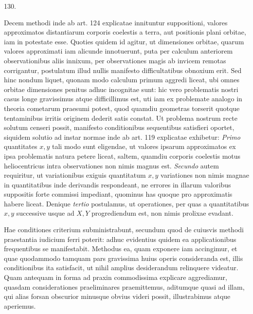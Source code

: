 \par{}\medskip
\begin{center}\hypertarget{native-177-article130}{}130.\end{center}
Decem methodi inde ab art. 124 explicatae innituntur suppositioni, valores
approximatos distantiarum corporis coelestis a terra, aut positionis plani
orbitae, iam in potestate esse. Quoties quidem id agitur, ut dimensiones
orbitae, quarum valores approximati iam alicunde innotuerunt, puta per calculum
anteriorem observationibus aliis innixum, per observationes magis ab invicem
remotas corrigantur, postulatum illud nullis manifesto difficultatibus obnoxium
erit. Sed hinc nondum liquet, quonam modo calculum primum aggredi liceat,
ubi omnes orbitae dimensiones penitus adhuc incognitae sunt: hic vero
problematis nostri casus longe gravissimus atque difficillimus est, uti iam
ex problemate analogo in theoria cometarum praesumi potest, quod quamdiu
geometras torserit quotque tentaminibus irritis originem dederit satis constat.
Ut problema nostrum recte solutum censeri possit, manifesto conditionibus
sequentibus satisfieri oportet, siquidem solutio ad instar normae inde ab
art. 119 explicatae exhibetur: \emph{Primo} quantitates $x,y$ tali modo sunt
eligendae, ut valores ipsarum approximatos ex ipsa problematis natura petere
liceat, saltem, quamdiu corporis coelestis motus heliocentricus intra
observationes non nimis magnus est. \emph{Secundo} autem requiritur, ut variationibus
exiguis quantitatum $x,y$ variationes non nimis magnae in quantitatibus inde
derivandis respondeant, ne errores in illarum valoribus suppositis forte
commissi impediant, quominus has quoque pro approximatis habere liceat.
Denique \emph{tertio} postulamus, ut operationes, per quas a quantitatibus $x,y$
successive usque ad $X,Y$ progrediendum est, non nimis prolixae evadant.

Hae conditiones criterium subministrabunt, secundum quod de cuiusvis
methodi praestantia iudicium ferri poterit: adhuc evidentius quidem ea
applicationibus frequentibus se manifestabit. Methodus ea, quam exponere iam
accingimur, et quae quodammodo tamquam pars gravissima huius operis
consideranda est, illis conditionibus ita satisfacit, ut nihil amplius desiderandum
relinquere videatur. Quam antequam in forma ad praxin commodissima explicare
aggrediamur, quasdam considerationes praeliminares praemittemus, aditumque
quasi ad illam, qui alias forsan obscurior minusque obvius videri possit,
illustrabimus atque aperiemus.
